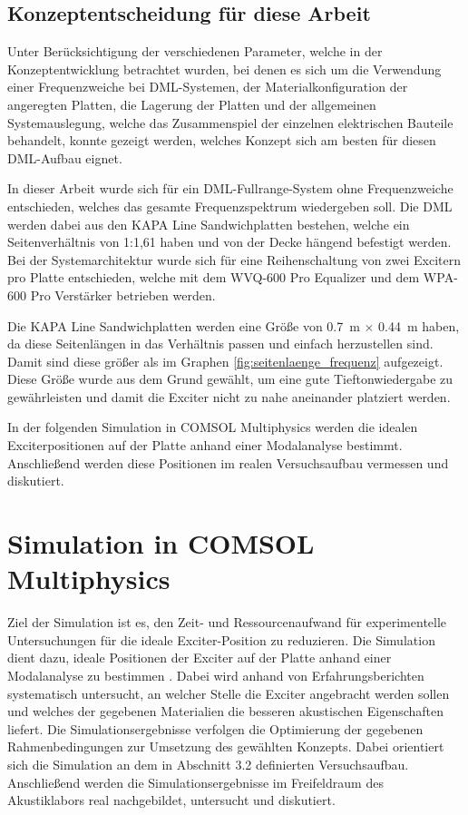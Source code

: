\subsection{Konzeptentscheidung für diese Arbeit}

Unter Berücksichtigung der verschiedenen Parameter, welche in der Konzeptentwicklung betrachtet wurden, bei denen es sich um die Verwendung einer Frequenzweiche bei DML-Systemen, der Materialkonfiguration der angeregten Platten, die Lagerung der Platten und der allgemeinen Systemauslegung, welche das Zusammenspiel der einzelnen elektrischen Bauteile behandelt, konnte gezeigt werden, welches Konzept sich am besten für diesen DML-Aufbau eignet.

In dieser Arbeit wurde sich für ein DML-Fullrange-System ohne Frequenzweiche entschieden, welches das gesamte Frequenzspektrum wiedergeben soll. Die DML werden dabei aus den KAPA Line Sandwichplatten bestehen, welche ein Seitenverhältnis von 1:1,61 haben und von der Decke hängend befestigt werden. Bei der Systemarchitektur wurde sich für eine Reihenschaltung von zwei Excitern pro Platte entschieden, welche mit dem WVQ-600 Pro Equalizer und dem WPA-600 Pro Verstärker betrieben werden. 

Die KAPA Line Sandwichplatten werden eine Größe von \SI{0,7}{\meter} $\times$ \SI{0,44}{\meter} haben, da diese Seitenlängen in das Verhältnis passen und einfach herzustellen sind. Damit sind diese größer als im Graphen \ref{fig:seitenlaenge_frequenz} aufgezeigt. Diese Größe wurde aus dem Grund gewählt, um eine gute Tieftonwiedergabe zu gewährleisten und damit die Exciter nicht zu nahe aneinander platziert werden. 

In der folgenden Simulation in COMSOL Multiphysics werden die idealen Exciterpositionen auf der Platte anhand einer Modalanalyse bestimmt. Anschließend werden diese Positionen im realen Versuchsaufbau vermessen und diskutiert.


\clearpage

\section{Simulation in COMSOL Multiphysics}

Ziel der Simulation ist es, den Zeit- und Ressourcenaufwand für experimentelle Untersuchungen für die ideale Exciter-Position zu reduzieren. Die Simulation dient dazu, ideale Positionen der Exciter auf der Platte anhand einer Modalanalyse zu bestimmen \cite{Moeser2020}. 
Dabei wird anhand von Erfahrungsberichten systematisch untersucht, an welcher Stelle die Exciter angebracht werden sollen und welches der gegebenen Materialien die besseren akustischen Eigenschaften liefert. Die Simulationsergebnisse verfolgen die Optimierung der gegebenen Rahmenbedingungen zur Umsetzung des gewählten Konzepts. Dabei orientiert sich die Simulation an dem in Abschnitt 3.2 definierten Versuchsaufbau. Anschließend werden die Simulationsergebnisse im Freifeldraum des Akustiklabors real nachgebildet, untersucht und diskutiert.  



